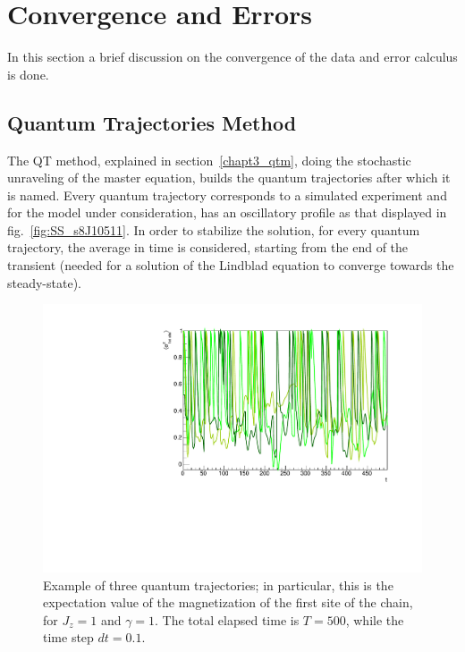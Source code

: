 \chapter{Convergence and Errors}
\label{AppendixB}

In this section a brief discussion on the convergence of the data and error calculus is done.

\section{Quantum Trajectories Method}
The QT method, explained in section~\ref{chapt3_qtm}, doing the stochastic unraveling of the master equation, builds the quantum trajectories after which it is named.  Every quantum trajectory corresponds to a simulated experiment and for the model under consideration, has an oscillatory profile as that displayed in fig.~\ref{fig:SS_s8J10511}. In order to stabilize the solution, for every quantum trajectory, the average in time is considered, starting from the end of the transient (needed for a solution of the Lindblad equation to converge towards the steady-state).

\begin{figure}[H]
    \centering
    \includegraphics[scale=0.7]{Figures/QTrajectories3.pdf}
    \captionsetup{width=1.\linewidth}
    \caption{Example of three quantum trajectories; in particular, this is the expectation value of the magnetization of the first site of the chain, for $J_z = 1$ and $\gamma = 1$. The total elapsed time is $T=500$, while the time step $dt = 0.1$.}
    \label{fig:QTrajectories3}
\end{figure}

